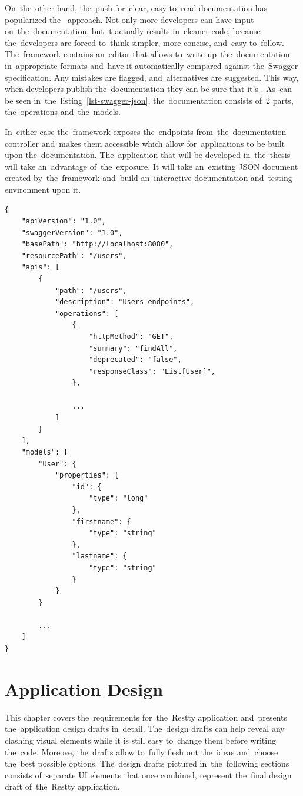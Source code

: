 On~the~other hand, the~push for~clear, easy to~read documentation has
popularized the~ approach. Not only more developers can have
input on~the~documentation, but it actually results in~cleaner code, because
the~developers are forced to~think simpler, more concise, and~easy to~follow.
The~framework contains an~editor that allows to~write up~the~documentation
in~appropriate formats and~have it automatically compared against the~Swagger
specification. Any mistakes are flagged, and~alternatives are suggested. This
way, when developers publish the~documentation they can be sure that it's
. As~can be seen in~the~listing~\ref{lst-swagger-json},
the~documentation consists of~2 parts, the~operations and~the~models.

In~either case the~framework exposes the~endpoints from~the~documentation
controller and~makes them accessible which allow for~applications to be built
upon the~documentation. The~application that will be developed in~the~thesis
will take an~advantage of~the~exposure. It will take an~existing JSON document
created by~the~framework and~build an~interactive documentation and~testing
environment upon it.

\vspace{1mm}
\begin{lstlisting}[caption=An~example of~API documentation in~JSON format
created using the~Swagger framework., style=dp-default, label=lst-swagger-json]
{
	"apiVersion": "1.0",
	"swaggerVersion": "1.0",
	"basePath": "http://localhost:8080",
	"resourcePath": "/users",
	"apis": [
		{
			"path": "/users",
			"description": "Users endpoints",
			"operations": [
				{
					"httpMethod": "GET",
					"summary": "findAll",
					"deprecated": "false",
					"responseClass": "List[User]", 
				},
				
				... 
			]
		}
	],
	"models": [
		"User": {
			"properties": {
				"id": {
					"type": "long"
				},
				"firstname": {
					"type": "string"
				},
				"lastname": {
					"type": "string"
				}
			}
		}
		
		...	
	]
}
\end{lstlisting}
  





\chapter{Application Design}
\label{Design}
This chapter covers the~requirements for~the~Restty application and~presents
the~application design drafts in~detail. The~design drafts can help reveal any
clashing visual elements while it is still easy to~change them before writing
the~code. Moreove, the~drafts allow to~fully flesh out the~ideas and~choose
the~best possible options. The~design drafts pictured in~the~following sections
consists of~separate UI elements that once combined, represent the~final design
draft of~the~Restty application.


